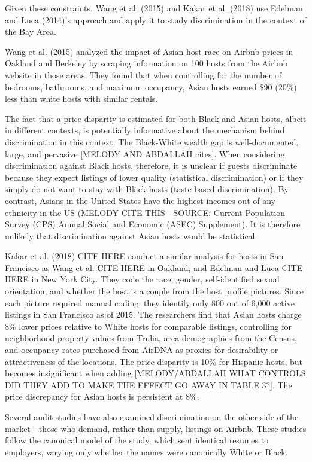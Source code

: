 Given these constraints, Wang et al. (2015) and Kakar et al. (2018) use Edelman and Luca (2014)’s approach and apply it to study discrimination in the context of the Bay Area. 

Wang et al. (2015) analyzed the impact of Asian host race on Airbnb prices in Oakland and Berkeley by scraping information on 100 hosts from the Airbnb website in those areas. They found that when controlling for the number of bedrooms, bathrooms, and maximum occupancy, Asian hosts earned \$90 (20\%) less than white hosts with similar rentals. 

The fact that a price disparity is estimated for both Black and Asian hosts, albeit in different contexts, is potentially informative about the mechanism behind discrimination in this context. The Black-White wealth gap is well-documented, large, and pervasive [MELODY AND ABDALLAH cites]. When considering discrimination against Black hosts, therefore, it is unclear if guests discriminate because they expect listings of lower quality (statistical discrimination) or if they simply do not want to stay with Black hosts (taste-based discrimination). By contrast, Asians in the United States have the highest incomes out of any ethnicity in the US (MELODY CITE THIS - SOURCE:  Current Population Survey (CPS) Annual Social and Economic (ASEC) Supplement). It is therefore unlikely that discrimination against Asian hosts would be statistical. 

Kakar et al. (2018) CITE HERE conduct a similar analysis for hosts in San Francisco as Wang et al. CITE HERE in Oakland, and Edelman and Luca CITE HERE  in New York City. They code the race, gender, self-identified sexual orientation, and whether the host is a couple from the host profile pictures. Since each picture required manual coding, they identify only 800 out of 6,000 active listings in San Francisco as of 2015. The researchers find that Asian hosts charge 8\% lower prices relative to White hosts for comparable listings, controlling for neighborhood property values from Trulia, area demographics from the Census, and occupancy rates purchased from AirDNA as proxies for desirability or attractiveness of the locations. The price disparity is 10\% for Hispanic hosts, but becomes insignificant when adding [MELODY/ABDALLAH WHAT CONTROLS DID THEY ADD TO MAKE THE EFFECT GO AWAY IN TABLE 3?]. The price discrepancy for Asian hosts is persistent at 8\%. 

Several audit studies have also examined discrimination on the other side of the market - those who demand, rather than supply, listings on Airbnb. These studies follow the canonical model of the \cite{bertrand} study, which sent identical resumes to employers, varying only whether the names were canonically White or Black. 

